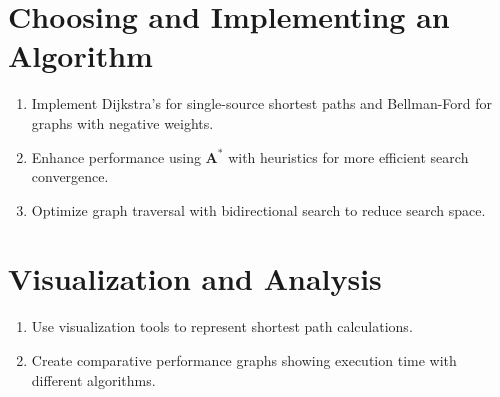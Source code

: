 \section{Choosing and Implementing an Algorithm}
\begin{enumerate}
	
	\item Implement Dijkstra’s for single-source shortest paths and Bellman-Ford for graphs with negative weights.
	\item Enhance performance using \( \mathbf{A^*} \) with heuristics for more efficient search convergence.
	\item Optimize graph traversal with bidirectional search to reduce search space.
	
\end{enumerate}

\section{Visualization and Analysis}

\begin{enumerate}
	\item Use visualization tools to represent shortest path calculations.
	\item Create comparative performance graphs showing execution time with different algorithms. 
\end{enumerate}
